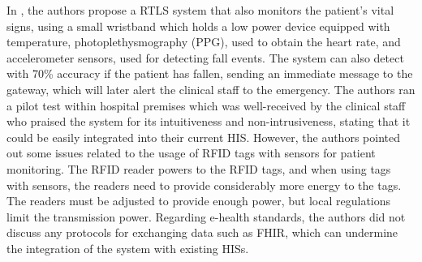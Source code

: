 In \cite{Adame2018}, the authors propose a RTLS system that also monitors the patient's vital signs, using a small wristband which holds a low power device equipped with temperature, photoplethysmography (PPG), used to obtain the heart rate, and accelerometer sensors, used for detecting fall events. The system can also detect with 70\% accuracy if the patient has fallen, sending an immediate message to the gateway, which will later alert the clinical staff to the emergency. The authors ran a pilot test within hospital premises which was well-received by the clinical staff who praised the system for its intuitiveness and non-intrusiveness, stating that it could be easily integrated into their current \acs{HIS}. However, the authors pointed out some issues related to the usage of \acs{RFID} tags with sensors for patient monitoring. The \acs{RFID} reader powers to the \acs{RFID} tags, and when using tags with sensors, the readers need to provide considerably more energy to the tags. The readers must be adjusted to provide enough power, but local regulations limit the transmission power. Regarding e-health standards, the authors did not discuss any protocols for exchanging data such as \acs{FHIR}, which can undermine the integration of the system with existing \acs{HIS}s. \bigskip

%


